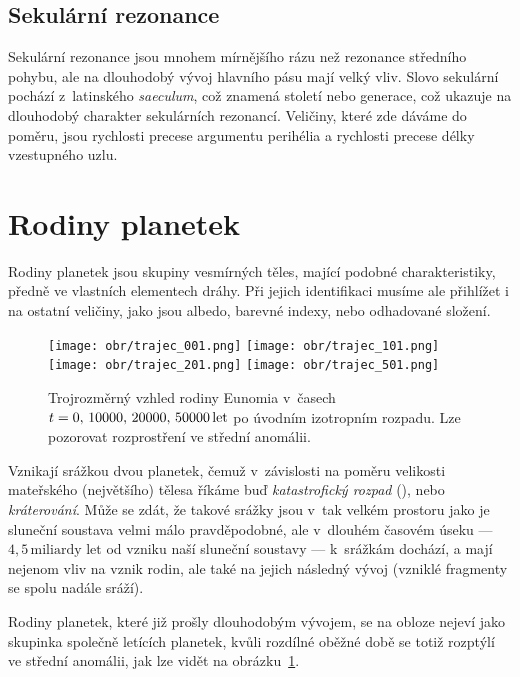 \documentclass[A4paper, 12pt, oneside]{book}
\newcommand{\I}[1]{\textit{#1}}
\begin{document}
\subsection{Sekulární rezonance} 
Sekulární rezonance jsou mnohem mírnějšího rázu než rezonance středního pohybu, ale na dlouhodobý vývoj hlavního pásu mají velký vliv. Slovo sekulární pochází z~latinského \I{saeculum}, což znamená století nebo generace, což ukazuje na dlouhodobý charakter sekulárních rezonancí. Veličiny, které zde dáváme do poměru, jsou rychlosti precese argumentu perihélia a rychlosti precese délky vzestupného uzlu. 
\section{Rodiny planetek}

Rodiny planetek jsou skupiny vesmírných těles, mající podobné charakteristiky, předně ve vlastních elementech dráhy. Při jejich identifikaci musíme ale přihlížet i na ostatní veličiny, jako jsou albedo, barevné indexy, nebo odhadované složení. 

\begin{figure}
	\centering
	\texttt{[image: obr/trajec\_001.png]}
	\texttt{[image: obr/trajec\_101.png]} \\
	\texttt{[image: obr/trajec\_201.png]}
	\texttt{[image: obr/trajec\_501.png]}
	\caption{Trojrozměrný vzhled rodiny Eunomia v~časech $t=0,\,10000,\,20000,\,50000\,{\rm let}$ po úvodním izotropním rozpadu. Lze pozorovat rozprostření ve střední anomálii.} \label{fig:trajec}
\end{figure}

Vznikají srážkou dvou planetek, čemuž v~závislosti na poměru velikosti mateřského (největšího) tělesa říkáme buď \I{katastrofický rozpad} (), nebo \I{kráterování}. Může se zdát, že takové srážky jsou v~tak velkém prostoru jako je sluneční soustava velmi málo pravděpodobné, ale v~dlouhém časovém úseku --- $4,5\,\text{miliardy let}$ od vzniku naší sluneční soustavy --- k~srážkám dochází, a mají nejenom vliv na vznik rodin, ale také na jejich následný vývoj (vzniklé fragmenty se spolu nadále sráží).


Rodiny planetek, které již prošly dlouhodobým vývojem, se na obloze nejeví jako skupinka společně letících planetek, kvůli rozdílné oběžné době se totiž rozptýlí ve střední anomálii, jak lze vidět na obrázku~\ref{fig:trajec}.
\end{document}
